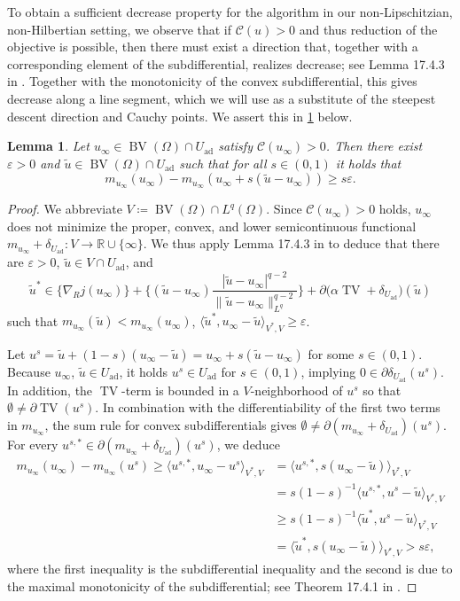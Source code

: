 \documentclass[11pt]{article}
\newcommand{\R}{\mathbb{R}}
\newcommand{\calC}{\mathcal{C}}
\DeclareMathOperator*{\BV}{BV}
\DeclareMathOperator*{\TV}{TV}
\newcommand{\feas}{U_{\textrm{ad}}}
\newtheorem{lemma}[theorem]{Lemma}
\theoremstyle{definition}
\theoremstyle{remark}
\begin{document}
To obtain a sufficient decrease property for the algorithm in our non-Lipschitzian, non-Hilbertian
setting, we observe that if $\calC(u) > 0$ and thus reduction of the objective is possible,
then there must exist a direction that, together with a corresponding element of the subdifferential,
realizes decrease; see Lemma 17.4.3 in \cite{attouch2014variational}. Together with the monotonicity of 
the convex subdifferential, this gives decrease along a line segment, which we will use as a
substitute of the steepest descent direction and Cauchy points. We assert this in \cref{lem:decrease}
below. 
%
\begin{lemma}\label{lem:decrease}
Let $u_\infty \in \BV(\Omega) \cap \feas$ satisfy $\calC(u_\infty) > 0$. Then there exist
$\varepsilon > 0$ and $\tilde{u} \in \BV(\Omega)
\cap \feas$ such that for all $s \in (0,1)$
it holds that
%
\[ m_{u_\infty}(u_\infty) - m_{u_\infty}(u_\infty + s(\tilde{u} - u_\infty)) \ge s \varepsilon.
\]
\end{lemma}
\begin{proof}
We abbreviate $V \coloneqq \BV(\Omega) \cap L^q(\Omega)$.
Since $\calC(u_\infty) > 0$ holds, $u_\infty$ does not minimize the proper, convex, and
lower semicontinuous functional $m_{u_\infty} + \delta_{\feas} : V \to \R \cup \{\infty\}$.
We thus apply  Lemma 17.4.3 in \cite{attouch2014variational} to deduce that there are
$\varepsilon > 0$, $\tilde{u} \in V \cap \feas$, and
%
\[ 
\tilde{u}^* \in 
   		\{\nabla_R j(u_\infty)\} 
   		+ \Big\{ (\tilde{u} - u_\infty)\frac{|\tilde{u} - u_\infty|^{q - 2}}{\|\tilde{u} - u_\infty\|^{q - 2}_{L^{q}}}\Big\}
  + \partial\big(\alpha \TV + \delta_{\feas}\big)(\tilde{u})
\]
%
such that $m_{u_\infty}(\tilde{u}) < m_{u_\infty}(u_\infty)$,
$\langle \tilde{u}^*, u_\infty - \tilde{u}\rangle_{V^*,V} \ge \varepsilon$.
	
Let $u^s = \tilde{u} + (1 - s)(u_\infty - \tilde{u}) = u_\infty + s(\tilde{u} - u_\infty)$ for
some $s \in (0,1)$. Because $u_\infty$, $\tilde{u} \in \feas$, it holds $u^s \in \feas$ for
$s \in (0,1)$, implying $0 \in \partial \delta_{\feas}(u^s)$. 
In addition, the $\TV$-term is bounded in a $V$-neighborhood of $u^s$ so that
$\emptyset \neq \partial\TV(u^s)$. In combination with the differentiability of the first two terms in
$m_{u_\infty}$, the sum rule for convex subdifferentials gives $\emptyset \neq \partial (m_{u_\infty} + \delta_{\feas})(u^s)$.
For every $u^{s,*} \in \partial(m_{u_\infty} + \delta_{\feas})(u^s)$, we deduce
%
\begin{align*}
m_{u_\infty}(u_\infty) - m_{u_\infty}(u^s)
\ge \langle u^{s,*}, u_\infty - u^s\rangle_{V^*,V} &= 
\langle u^{s,*}, s(u_\infty - \tilde{u}) \rangle_{V^*,V}\\
&= s(1 - s)^{-1} \langle u^{s,*}, u^s - \tilde{u} \rangle_{V^*,V}\\
&\ge s(1 - s)^{-1} \langle \tilde{u}^*, u^s - \tilde{u} \rangle_{V^*,V}\\
&= \langle \tilde{u}^*, s(u_\infty - \tilde{u}) \rangle_{V^*,V} > s\varepsilon,
\end{align*}
%
where the first inequality is the subdifferential inequality and the second is due to the maximal
monotonicity of the subdifferential; see Theorem 17.4.1 in \cite{attouch2014variational}.
\end{proof}
\end{document}
